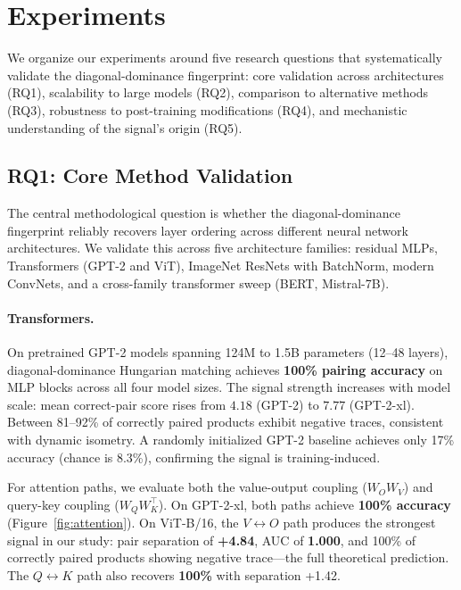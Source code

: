 \documentclass[wcp]{jmlr}
\begin{document}
\section{Experiments}\label{sec:experiments}

We organize our experiments around five research questions that systematically validate the diagonal-dominance fingerprint: core validation across architectures (RQ1), scalability to large models (RQ2), comparison to alternative methods (RQ3), robustness to post-training modifications (RQ4), and mechanistic understanding of the signal's origin (RQ5).

\subsection{RQ1: Core Method Validation}

The central methodological question is whether the diagonal-dominance fingerprint reliably recovers layer ordering across different neural network architectures. We validate this across five architecture families: residual MLPs, Transformers (GPT-2 and ViT), ImageNet ResNets with BatchNorm, modern ConvNets, and a cross-family transformer sweep (BERT, Mistral-7B).

\paragraph{Transformers.}
On pretrained GPT-2 models spanning 124M to 1.5B parameters (12--48 layers), diagonal-dominance Hungarian matching achieves \textbf{100\% pairing accuracy} on MLP blocks across all four model sizes. The signal strength increases with model scale: mean correct-pair score rises from $4.18$ (GPT-2) to $7.77$ (GPT-2-xl). Between 81--92\% of correctly paired products exhibit negative traces, consistent with dynamic isometry. A randomly initialized GPT-2 baseline achieves only 17\% accuracy (chance is 8.3\%), confirming the signal is training-induced.

For attention paths, we evaluate both the value-output coupling ($W_O W_V$) and query-key coupling ($W_Q W_K^\top$). On GPT-2-xl, both paths achieve \textbf{100\% accuracy} (Figure~\ref{fig:attention}). On ViT-B/16, the $V\!\leftrightarrow\!O$ path produces the strongest signal in our study: pair separation of \textbf{+4.84}, AUC of \textbf{1.000}, and 100\% of correctly paired products showing negative trace---the full theoretical prediction. The $Q\!\leftrightarrow\!K$ path also recovers \textbf{100\%} with separation +1.42.
\end{document}
